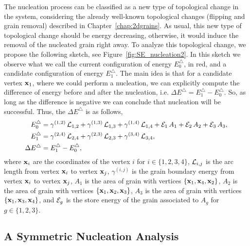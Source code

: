 The nucleation process can be classified as a new type of topological change in the system, considering the already well-known topological changes (flipping and  grain removal) described in Chapter~\ref{chap:2dgrains}. 
As usual, this new type of topological change should be energy decreasing, otherwise, it would 
induce the removal of the nucleated grain right away.
To analyze this topological change, we propose the following sketch, see Figure~\ref{fig:SE_nucleation2}.
In this sketch we observe what we call
the current configuration of energy $E_0^{\triangle}$, in red, and a candidate configuration of energy $E_1^{\triangle}$.
The main idea is that for a candidate vertex $\x_1$, where we could perform a nucleation,
we can explicitly compute the difference of energy
before and after the nucleation, i.e. $\Delta E^{\triangle}=E_1^{\triangle}-E_0^{\triangle}$. 
So, as long as the difference is negative we can conclude that nucleation will be successful. 
Thus, the $\Delta E^{\triangle}$ is as follows,
\begin{align}
    E_0^{\triangle} &= \gamma^{(1,2)}\,\mathcal{L}_{1,2}
    +\gamma^{(1,3)}\,\mathcal{L}_{1,3}+\gamma^{(1,4)}\,\mathcal{L}_{1,4}
    +\mathcal{E}_1\,A_1+\mathcal{E}_2\,A_2+\mathcal{E}_3\,A_3,\nonumber\\
    E_1^{\triangle} &= \gamma^{(2,4)}\,\mathcal{L}_{2,4}
    +\gamma^{(2,3)}\,\mathcal{L}_{2,3}+\gamma^{(3,4)}\,\mathcal{L}_{3,4},\nonumber\\
    \Delta E^{\triangle} &= E_1^{\triangle}-E_0^{\triangle},
    \label{eq:Delta_E_Nucleation}
\end{align}
%
where $\x_i$ are the coordinates of the vertex $i$ for $i\in\{1,2,3,4\}$, 
$\mathcal{L}_{i,j}$ is the arc length from vertex $\x_i$ to vertex $\x_{j}$, $\gamma^{(i,j)}$ is the grain boundary energy from vertex $\x_i$ to vertex $\x_{j}$,  
$A_1$ is the area of grain with vertices $\{\x_1,\x_4,\x_2\}$,
$A_2$ is the area of grain with vertices $\{\x_1,\x_2,\x_3\}$,
$A_3$ is the area of grain with vertices $\{\x_1,\x_3,\x_4\}$,
and $\mathcal{E}_g$ is the store energy of the grain associated to $A_g$ for $g \in \{1,2,3\}$.


\subsection{A Symmetric Nucleation Analysis}

